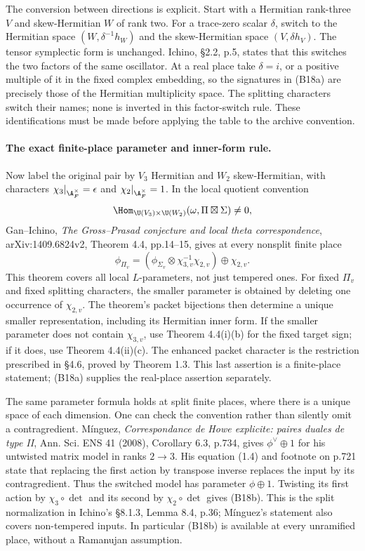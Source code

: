 \documentclass[11pt]{article}
\theoremstyle{definition}\newtheorem{definition}[theorem]{Definition}\newtheorem{remark}[theorem]{Remark}
\begin{document}
The conversion between directions is explicit. Start with a
Hermitian rank-three $V$ and skew-Hermitian $W$ of rank two.
For a trace-zero scalar $\delta$, switch to the Hermitian space
$(W,\delta^{-1}h_W)$ and the skew-Hermitian space
$(V,\delta h_V)$. The tensor symplectic form is unchanged.
Ichino, \S2.2, p.5, states that this switches the two factors of
the same oscillator. At a real place take $\delta=i$, or a
positive multiple of it in the fixed complex embedding, so the
signatures in (B18a) are precisely those of the Hermitian
multiplicity space. The splitting characters switch their names;
none is inverted in this factor-switch rule. These identifications
must be made before applying the table to the archive convention.

\paragraph{The exact finite-place parameter and inner-form rule.}
Now label the original pair by $V_3$ Hermitian and $W_2$
skew-Hermitian, with characters $\chi_3|_{\A_F^\times}=\epsilon$
and $\chi_2|_{\A_F^\times}=1$. In the local quotient convention
\[
 \Hom_{\U(V_3)\times\U(W_2)}
       (\omega,\Pi\boxtimes\Sigma)\ne0,
\]
Gan--Ichino, \emph{The Gross--Prasad conjecture and local theta
correspondence}, arXiv:1409.6824v2, Theorem 4.4, pp.14--15,
gives at every nonsplit finite place
\[
 \phi_{\Pi_v}
    =(\phi_{\Sigma_v}\otimes\chi_{3,v}^{-1}\chi_{2,v})
                                      \oplus\chi_{2,v}.
 \tag{B18b}
\]
This theorem covers all local $L$-parameters, not just tempered
ones. For fixed $\Pi_v$ and fixed splitting characters, the
smaller parameter is obtained by deleting one occurrence of
$\chi_{2,v}$. The theorem's packet bijections then determine a
unique smaller representation, including its Hermitian inner
form. If the smaller parameter does not contain $\chi_{3,v}$,
use Theorem 4.4(i)(b) for the fixed target sign; if it does,
use Theorem 4.4(ii)(c). The enhanced packet character is the
restriction prescribed in \S4.6, proved by Theorem 1.3. This
last assertion is a finite-place statement; (B18a) supplies the
real-place assertion separately.

The same parameter formula holds at split finite places, where
there is a unique space of each dimension. One can check the
convention rather than silently omit a contragredient.
M\'inguez, \emph{Correspondance de Howe explicite: paires duales
de type II}, Ann. Sci. ENS 41 (2008), Corollary 6.3, p.734,
gives $\phi^\vee\oplus1$ for his untwisted matrix model in
ranks $2\to3$. His equation (1.4) and footnote on p.721 state
that replacing the first action by transpose inverse replaces
the input by its contragredient. Thus the switched model has
parameter $\phi\oplus1$. Twisting its first action by
$\chi_3\circ\det$ and its second by $\chi_2\circ\det$ gives
(B18b). This is the split normalization in Ichino's \S8.1.3,
Lemma 8.4, p.36; M\'inguez's statement also covers non-tempered
inputs. In particular (B18b) is available at every unramified
place, without a Ramanujan assumption.
\end{document}
